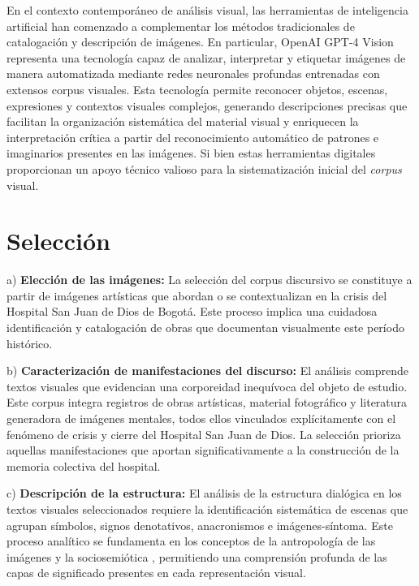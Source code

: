 \textcolor{edit30sept}{En el contexto contemporáneo de análisis visual, las herramientas de inteligencia artificial han comenzado a complementar los métodos tradicionales de catalogación y descripción de imágenes. En particular, OpenAI GPT-4 Vision representa una tecnología capaz de analizar, interpretar y etiquetar imágenes de manera automatizada mediante redes neuronales profundas entrenadas con extensos corpus visuales. Esta tecnología permite reconocer objetos, escenas, expresiones y contextos visuales complejos, generando descripciones precisas que facilitan la organización sistemática del material visual y enriquecen la interpretación crítica a partir del reconocimiento automático de patrones e imaginarios presentes en las imágenes. Si bien estas herramientas digitales proporcionan un apoyo técnico valioso para la sistematización inicial del \textit{corpus} visual.}

\section{Selección}

a) \textbf{Elección de las imágenes:} La selección del corpus discursivo se constituye a partir de imágenes artísticas que abordan o se contextualizan en la crisis del Hospital San Juan de Dios de Bogotá. Este proceso implica una cuidadosa identificación y catalogación de obras que documentan visualmente este período histórico.

b) \textbf{Caracterización de manifestaciones del discurso:} El análisis comprende textos visuales que evidencian una corporeidad inequívoca del objeto de estudio. Este corpus integra registros de obras artísticas, material fotográfico y literatura generadora de imágenes mentales, todos ellos vinculados explícitamente con el fenómeno de crisis y cierre del Hospital San Juan de Dios. La selección prioriza aquellas manifestaciones que aportan significativamente a la construcción de la memoria colectiva del hospital.

c) \textbf{Descripción de la estructura:} El análisis de la estructura dialógica en los textos visuales seleccionados requiere la identificación sistemática de escenas que agrupan símbolos, signos denotativos, anacronismos e imágenes-síntoma. Este proceso analítico se fundamenta en los conceptos de la antropología de las imágenes y la sociosemiótica \parencite{Abril2007}, permitiendo una comprensión profunda de las capas de significado presentes en cada representación visual.

